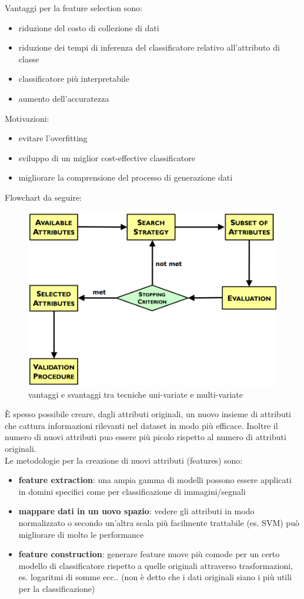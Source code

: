 \noindent
Vantaggi per la feature selection sono:
\begin{itemize}
	\item riduzione del costo di collezione di dati
	\item riduzione dei tempi di inferenza del classificatore relativo all'attributo di classe
	\item classificatore pi\`u interpretabile
	\item aumento dell'accuratezza
\end{itemize}
Motivazioni:
\begin{itemize}
	\item evitare l'overfitting
	\item sviluppo di un miglior cost-effective classificatore
	\item migliorare la comprensione del processo di generazione dati
\end{itemize}

Flowchart da seguire:
\begin{figure}[H]
	\centering
	\includegraphics[height=0.45 \linewidth]{classification/pict/feature_flowchart.png}
	\caption{vantaggi e svantaggi tra tecniche uni-variate e multi-variate}
\end{figure}

È spesso possibile creare, dagli attributi originali, un nuovo insieme di attributi che cattura informazioni rilevanti nel dataset in modo più efficace. Inoltre il numero di nuovi attributi puo essere più picolo rispetto al numero di attributi originali.\\

Le metodologie per la creazione di nuovi attributi (features) sono:
\begin{itemize}
	\item \textbf{feature extraction}: una ampia gamma di modelli possono essere applicati in domini specifici come per classificazione di immagini/segnali
	\item \textbf{mappare dati in un uovo spazio}: vedere gli attributi in modo normalizzato o secondo un'altra scala pi\`u facilmente trattabile (es. SVM) può migliorare di molto le performance
	\item \textbf{feature construction}: generare feature nuove pi\`u comode per un certo modello di classificatore rispetto a quelle originali attraverso trasformazioni, es. logaritmi di somme ecc.. (non \`e detto che i dati originali siano i pi\`u utili per la classificazione)
\end{itemize}
